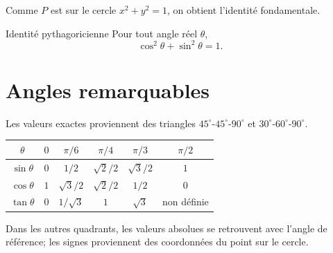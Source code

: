 \begin{center}
\end{center}

Comme $P$ est sur le cercle $x^2+y^2=1$, on obtient l'identité fondamentale.

\begin{theorem}{Identité pythagoricienne}{}
Pour tout angle réel $\theta$,
\[
\cos^2\theta+\sin^2\theta=1.
\]
\end{theorem}

\section{Angles remarquables}
\label{manual:section:14.03}

Les valeurs exactes proviennent des triangles $45^\circ$-$45^\circ$-$90^\circ$ et $30^\circ$-$60^\circ$-$90^\circ$.

\begin{center}
\begin{tabular}{c|ccccc}
\toprule
$\theta$ & $0$ & $\pi/6$ & $\pi/4$ & $\pi/3$ & $\pi/2$ \\
\midrule
$\sin\theta$ & $0$ & $1/2$ & $\sqrt2/2$ & $\sqrt3/2$ & $1$ \\
$\cos\theta$ & $1$ & $\sqrt3/2$ & $\sqrt2/2$ & $1/2$ & $0$ \\
$\tan\theta$ & $0$ & $1/\sqrt3$ & $1$ & $\sqrt3$ & non définie \\
\bottomrule
\end{tabular}
\end{center}

Dans les autres quadrants, les valeurs absolues se retrouvent avec l'angle de référence; les signes proviennent des coordonnées du point sur le cercle.

